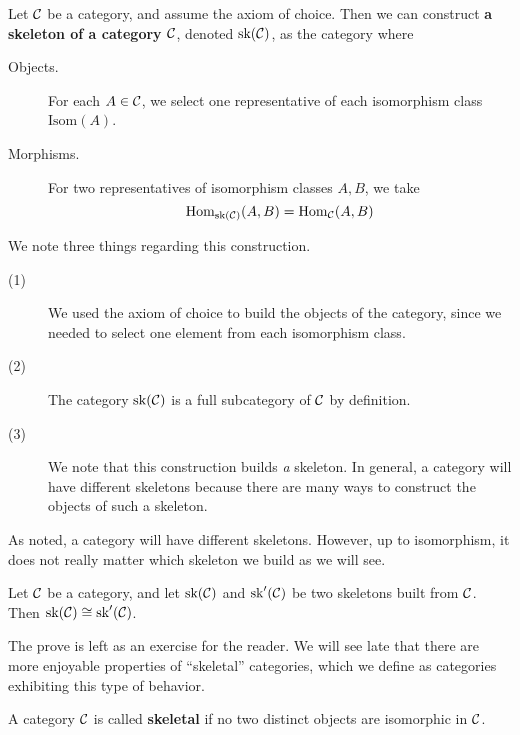     \begin{definition}
        Let $\mathcal{C}$ be a category, and assume the axiom of choice. Then we can construct 
        \textbf{a skeleton of a category $\mathcal{C}$}, denoted $\text{sk}(\mathcal{C})$, as 
        the category where 
        \begin{description}
            \item[Objects.] For each $A \in \mathcal{C}$, we select one 
            representative of each isomorphism class $\text{Isom}(A)$.
            \item[Morphisms.] For two representatives of isomorphism 
            classes $A, B$, we take 
            \[
                \operatorname{\mathrm{Hom}}_{\text{sk}(\mathcal{C})}(A,B)= \operatorname{\mathrm{Hom}}_{\mathcal{C}}(A,B)
            \] 
        \end{description}
    \end{definition}
    We note three things regarding this construction. 
    \begin{description}
        \item[(1)] We used the axiom of choice to build the objects of the 
        category, since we needed to select one element from each isomorphism class.
        \item[(2)] The category $\text{sk}(\mathcal{C})$ is a full subcategory of $\mathcal{C}$ by definition.
        \item[(3)] We note that this construction builds \emph{a} skeleton. In general, 
        a category will have different skeletons because there are many ways to construct the 
        objects of such a skeleton. 
    \end{description}
    As noted, a category will have different skeletons. However, up to isomorphism, it does 
    not really matter which skeleton we build as we will see. 
    
    \begin{lemma}\label{lemma:skeletons_are_isomorphic}
        Let $\mathcal{C}$ be a category, and let $\text{sk}(\mathcal{C})$ and $\text{sk}'(\mathcal{C})$ 
        be two skeletons built from $\mathcal{C}$. Then $\text{sk}(\mathcal{C}) \cong \text{sk}'(\mathcal{C})$. 
    \end{lemma}

    The prove is left as an exercise for the reader. We will see late that there 
    are more enjoyable properties of ``skeletal'' categories, which we define as categories 
    exhibiting this type of behavior.

    \begin{definition}
        A category $\mathcal{C}$ is called \textbf{skeletal} if no two distinct objects are isomorphic in $\mathcal{C}$.
    \end{definition}

